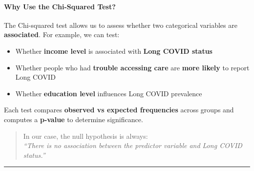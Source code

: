\documentclass[
]{article}
\providecommand{\tightlist}{%
  \setlength{\itemsep}{0pt}\setlength{\parskip}{0pt}}
\begin{document}
\paragraph{Why Use the Chi-Squared
Test?}\label{why-use-the-chi-squared-test}

The Chi-squared test allows us to assess whether two categorical
variables are \textbf{associated}. For example, we can test:

\begin{itemize}
\tightlist
\item
  Whether \textbf{income level} is associated with \textbf{Long COVID
  status}
\item
  Whether people who had \textbf{trouble accessing care} are
  \textbf{more likely} to report Long COVID
\item
  Whether \textbf{education level} influences Long COVID prevalence
\end{itemize}

Each test compares \textbf{observed vs expected frequencies} across
groups and computes a \textbf{p-value} to determine significance.

\begin{quote}
In our case, the null hypothesis is always:\\
\emph{``There is no association between the predictor variable and Long
COVID status.''}
\end{quote}

\begin{center}\rule{0.5\linewidth}{0.5pt}\end{center}
\end{document}
